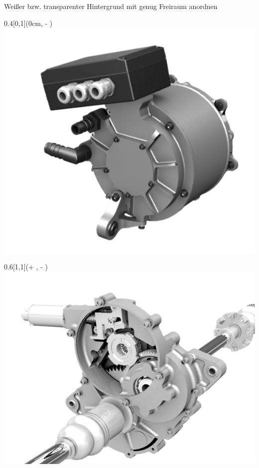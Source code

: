 \begin{frame}
\begin{frame}
\end{frame}
\clearpage

\begin{frame}
    
    Weißer bzw. transparenter Hintergrund\newline
    mit genug Freiraum anordnen


\begin{textblock*}{0.4\paperwidth}[0,1](0cm, \textheight - \PraesentationSeitenrand)%
\includegraphics[width=0.4\paperwidth]{./Resources/Presentation/Images/Motor.png}
\end{textblock*}

\begin{textblock*}{0.6\paperwidth}[1,1](\textwidth + \PraesentationSeitenrand, \textheight - \PraesentationSeitenrand)%
\includegraphics[width=0.6\paperwidth]{./Resources/Presentation/Images/Getriebe.png}
\end{textblock*}


\end{frame}
\end{frame}

